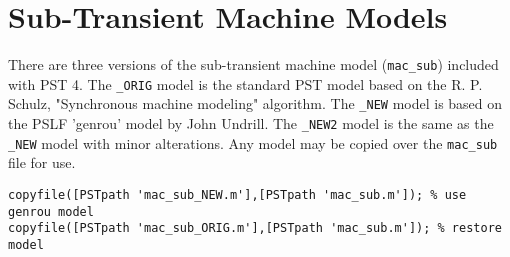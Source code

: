 \section{Sub-Transient Machine Models}  
There are three versions of the sub-transient machine model (\verb|mac_sub|) included with PST 4.
The \verb|_ORIG| model is the standard PST model based on the R. P. Schulz, "Synchronous machine modeling" algorithm.
The \verb|_NEW| model is based on the PSLF 'genrou' model by John Undrill.
The \verb|_NEW2| model is the same as the \verb|_NEW| model with minor alterations.
Any model may be copied over the \verb|mac_sub| file for use.
\begin{verbatim}
copyfile([PSTpath 'mac_sub_NEW.m'],[PSTpath 'mac_sub.m']); % use genrou model
copyfile([PSTpath 'mac_sub_ORIG.m'],[PSTpath 'mac_sub.m']); % restore model
\end{verbatim}